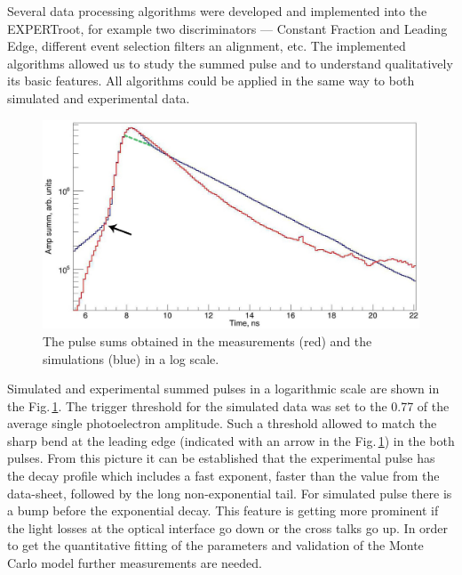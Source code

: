 \documentclass{webofc}
\newcommand{\er}{\textmd{EXPERTroot}}
\begin{document}
Several data processing algorithms were developed and implemented into the \er, for example two discriminators --- Constant Fraction and Leading Edge, different event selection filters an alignment, etc. The implemented algorithms allowed us to study the summed pulse and to understand qualitatively its basic features. All algorithms could be applied in the same way to both simulated and experimental data.

\begin{figure}
	\includegraphics[width=\linewidth]{summ.png}
	\caption{The pulse sums obtained in the measurements (red) and the simulations (blue) in a log scale.}\label{ris:sum}
\end{figure}


Simulated and experimental summed pulses in a logarithmic scale are shown in the Fig.\,\ref{ris:sum}.
The trigger threshold for the simulated data was set to the 0.77 of the average single photoelectron amplitude.
Such a threshold allowed to match the sharp bend at the leading edge (indicated with an arrow in the Fig.\,\ref{ris:sum}) in the both pulses. From this picture it can be established that the experimental pulse has the decay profile which includes a fast exponent, faster than the value from the data-sheet, followed by the long non-exponential tail. For simulated pulse there is a bump before the exponential decay. This feature is getting more prominent if the light losses at the optical interface go down or the cross talks go up. In order to get the quantitative fitting of the parameters and validation of the Monte Carlo model further measurements are needed. 
\end{document}
